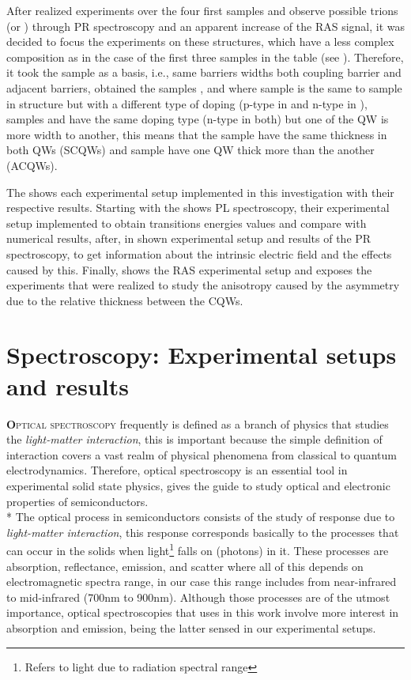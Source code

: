 After realized experiments over the four first samples and observe possible trions  (\xp or \xm)  through \gls{PR} spectroscopy and an apparent increase of the RAS signal, it was decided to focus the experiments on these structures, which have a less complex composition as in the case of the first three samples in the table (see ). Therefore,  it took the sample \tucu as a  basis, i.e., same barriers widths both coupling barrier and adjacent barriers, obtained the samples \tcvu, \tcvd and \tcvt where sample \tcvd is the same to sample \tcvu in structure but with a different type of doping (p-type in \tcvd and n-type in \tcvu), samples \tcvu and \tcvd have the same doping type (n-type in both) but one of the QW is more width to another, this means that the sample \tcvt have the same thickness in both QWs (SCQWs) and sample \tcvu have one  QW  thick more than the another (ACQWs). 

The   shows each experimental setup implemented in this investigation with their respective results. Starting with the   shows PL spectroscopy, their experimental setup implemented to obtain transitions energies values and compare with numerical results, after,  in  shown experimental setup and results of the PR spectroscopy, to get information about the intrinsic electric field and the effects caused by this. Finally,   shows the RAS experimental setup and exposes the experiments that were realized to study the anisotropy caused by the asymmetry due to the relative thickness between the CQWs.

\section{Spectroscopy: Experimental setups and results}
\label{sec:chapter 3 Spectroscopy}
\vspace{-10mm} 
\lettrine[lines=3, lraise=.1, nindent=0mm, slope=0mm]{\textbf{O}}{ptical spectroscopy} frequently is defined as a branch of physics that studies the \emph{light-matter interaction}, this is important because the simple definition of interaction covers a vast realm of physical phenomena from classical to quantum electrodynamics\cite{weiner2017light}. Therefore, optical spectroscopy is an essential tool in experimental solid state physics, gives the guide to study optical and electronic properties of semiconductors.\\*
The optical process in semiconductors consists of the study of response due to \emph{light-matter interaction}, this response corresponds basically to the processes that can occur in the solids when light\footnote{Refers to light due to radiation spectral range} falls on (photons) in it. These processes are absorption, reflectance, emission, and scatter where all of this depends on electromagnetic spectra range, in our case this range includes from near-infrared to mid-infrared (700nm to 900nm).  Although those processes are of the utmost importance, optical spectroscopies that uses in this work involve more interest in absorption and emission, being the latter sensed in our experimental setups.  \\

